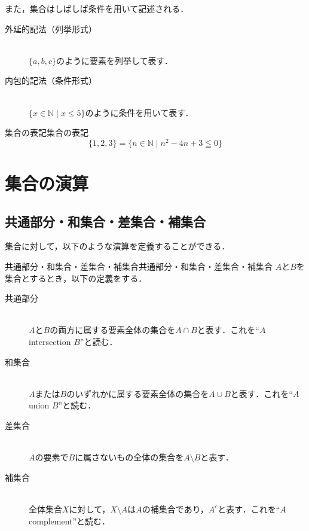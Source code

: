 また，集合はしばしば条件を用いて記述される．

\begin{description}
  \item[外延的記法（列挙形式）] \mbox{} \\
        $\{ a, b, c \}$のように要素を列挙して表す．
  \item[内包的記法（条件形式）] \mbox{} \\
        $\{ x \in \mathbb{N} \mid x \leq 5 \}$のように条件を用いて表す．
\end{description}


\begin{example}{集合の表記}{集合の表記}
  \[
    \{ 1,2,3 \} = \{ n \in \mathbb{N} \mid  n^2 -4n +3 \leqq 0 \}
  \]
\end{example}

\section{集合の演算}

\subsection{共通部分・和集合・差集合・補集合}
集合に対して，以下のような演算を定義することができる．

\begin{definition}{共通部分・和集合・差集合・補集合}{共通部分・和集合・差集合・補集合}
  $A$と$B$を集合とするとき，以下の定義をする．
  \begin{description}
    \item[共通部分] \mbox{}\\
          $A$と$B$の両方に属する要素全体の集合を$A \cap B$と表す．これを``$A$ intersection $B$''と読む．
    \item[和集合] \mbox{} \\
          $A$または$B$のいずれかに属する要素全体の集合を$A \cup B$と表す．これを``$A$ union $B$''と読む．
    \item[差集合]\mbox{}\\
          $A$の要素で$B$に属さないもの全体の集合を$A \setminus B$と表す．
    \item[補集合] \mbox{}\\
          全体集合$X$に対して，$X \setminus A$は$A$の補集合であり，$A^c$と表す．これを``$A$ complement''と読む．
  \end{description}
\end{definition}


